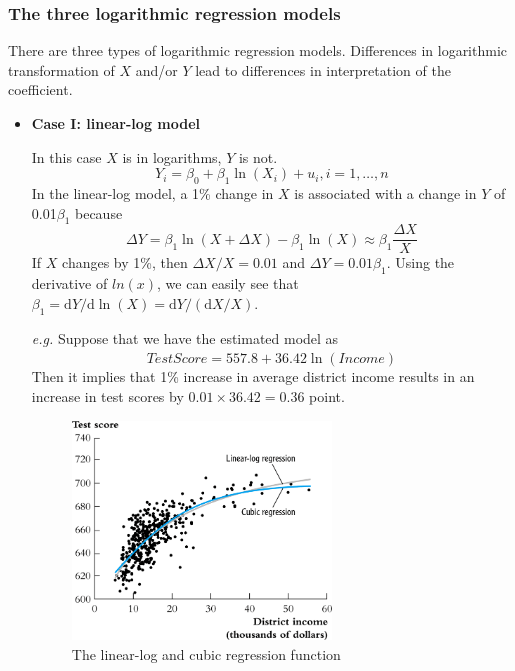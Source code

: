 \documentclass[a4paper,11pt]{article}
\newcommand{\dx}{\mathrm{d}}
\begin{document}
\subsubsection*{The three logarithmic regression models}
\label{sec:org3aa34c8}
There are three types of logarithmic regression models. Differences in
logarithmic transformation of \(X\) and/or \(Y\) lead to differences in
interpretation of the coefficient.

\begin{itemize}
\item \textbf{Case I: linear-log model}
\label{sec:orgc0bf9ad}

In this case \(X\) is in logarithms, \(Y\) is not.
\begin{equation}
\label{eq:linear-log}
Y_i = \beta_0 + \beta_1 \ln(X_i) + u_i, i = 1, \ldots, n
\end{equation}
In the linear-log model, a 1\% change in \(X\) is associated with a
change in \(Y\) of 0.01\(\beta_{\text{1}}\) because
\[ \Delta Y = \beta_1 \ln(X + \Delta X) - \beta_1 \ln(X) \approx
\beta_1 \frac{\Delta X}{X} \]
If \(X\) changes by 1\%, then \(\Delta X/X = 0.01\) and \(\Delta Y =
0.01\beta_1\). Using the derivative of \(ln(x)\), we can easily see that
\(\beta_1 = \dx Y/\dx \ln(X) = \dx Y / (\dx X/X)\).

\emph{e.g.} Suppose that we have the estimated model as
\[\widehat{TestScore} = 557.8 + 36.42\ln(Income)\]
Then it implies that 1\% increase in average district income results in an
increase in test scores by \(0.01 \times 36.42 = 0.36\) point.

\begin{figure}[htbp]
\centering
\includegraphics[width=0.65\textwidth]{img/fig-8-5.png}
\caption{\label{fig:org3d8b02e}
The linear-log and cubic regression function}
\end{figure}


\end{itemize}
\end{document}
